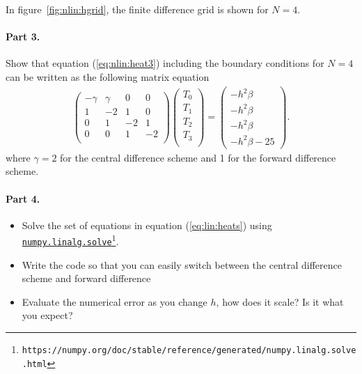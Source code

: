 \documentclass[graybox,sectrefs,envcountresetchap,open=right,final]{svmonodo}
\newenvironment{doconceexercise}{}{}
\begin{document}
\begin{doconceexercise}
In figure~\ref{fig:nlin:hgrid}, the finite difference grid is shown for
$N=4$.

\paragraph{Part 3.}

Show that equation (\ref{eq:nlin:heat3}) including the boundary conditions for $N=4$ can be written as the following matrix equation
\begin{align}
\left(
\begin{array}{cccc}
-\gamma&\gamma&0&0\\ 
1&-2&1&0\\ 
0&1&-2&1\\ 
0&0&1&-2\\ 
\end{array}
\right)
\left(
\begin{array}{c}
T_0\\ 
T_1\\ 
T_2\\ 
T_3\\ 
\end{array}
\right)
=
\left(
\begin{array}{c}
-h^2\beta\\ 
-h^2\beta\\ 
-h^2\beta\\ 
-h^2\beta-25
\end{array}
\right).
\end{align}
\label{eq:lin:heats}
where $\gamma=2$ for the central difference scheme and 1 for the forward difference scheme.

\paragraph{Part 4.}
\begin{itemize}
\item Solve the set of equations in equation (\ref{eq:lin:heats}) using \href{{https://numpy.org/doc/stable/reference/generated/numpy.linalg.solve.html}}{\nolinkurl{numpy.linalg.solve}\footnote{\texttt{https://numpy.org/doc/stable/reference/generated/numpy.linalg.solve.html}}}.

\item Write the code so that you can easily switch between the central difference scheme and forward difference

\item Evaluate the numerical error as you change $h$, how does it scale? Is it what you expect?
\end{itemize}


\end{doconceexercise}
\end{document}
